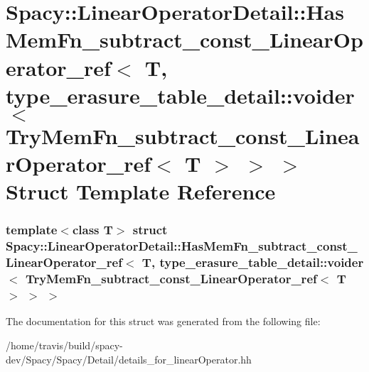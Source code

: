\hypertarget{structSpacy_1_1LinearOperatorDetail_1_1HasMemFn__subtract__const__LinearOperator__ref_3_01T_00_00d56ee75a3e42bf7b2f77b87a72299d4}{\section{\-Spacy\-:\-:\-Linear\-Operator\-Detail\-:\-:\-Has\-Mem\-Fn\-\_\-subtract\-\_\-const\-\_\-\-Linear\-Operator\-\_\-ref$<$ \-T, type\-\_\-erasure\-\_\-table\-\_\-detail\-:\-:voider$<$ \-Try\-Mem\-Fn\-\_\-subtract\-\_\-const\-\_\-\-Linear\-Operator\-\_\-ref$<$ \-T $>$ $>$ $>$ \-Struct \-Template \-Reference}
\label{structSpacy_1_1LinearOperatorDetail_1_1HasMemFn__subtract__const__LinearOperator__ref_3_01T_00_00d56ee75a3e42bf7b2f77b87a72299d4}
}
\subsubsection*{template$<$class T$>$ struct Spacy\-::\-Linear\-Operator\-Detail\-::\-Has\-Mem\-Fn\-\_\-subtract\-\_\-const\-\_\-\-Linear\-Operator\-\_\-ref$<$ T, type\-\_\-erasure\-\_\-table\-\_\-detail\-::voider$<$ Try\-Mem\-Fn\-\_\-subtract\-\_\-const\-\_\-\-Linear\-Operator\-\_\-ref$<$ T $>$ $>$ $>$}



\-The documentation for this struct was generated from the following file\-:\begin{DoxyCompactItemize}
\item 
/home/travis/build/spacy-\/dev/\-Spacy/\-Spacy/\-Detail/details\-\_\-for\-\_\-linear\-Operator.\-hh\end{DoxyCompactItemize}
